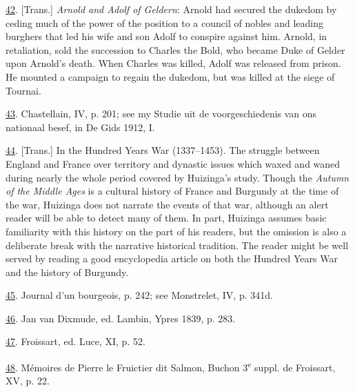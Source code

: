 \protect\hypertarget{23_NOTES.xhtmlux5cux23id_2148}{\protect\hyperlink{08_Chapter_One__THE_PASSIONATE_INTE.xhtmlux5cux23id_2147}{42}}.
{[}Trans.{]} \emph{Arnold and Adolf of Geldern}: Arnold had secured the
dukedom by ceding much of the power of the position to a council of
nobles and leading burghers that led his wife and son Adolf to conspire
against him. Arnold, in retaliation, sold the succession to Charles the
Bold, who became Duke of Gelder upon Arnold's death. When Charles was
killed, Adolf was released from prison. He mounted a campaign to regain
the dukedom, but was killed at the siege of Tournai.

\protect\hypertarget{23_NOTES.xhtmlux5cux23id_2146}{\protect\hyperlink{08_Chapter_One__THE_PASSIONATE_INTE.xhtmlux5cux23id_2145}{43}}.
Chastellain, IV, p. 201; see my Studie uit de voorgeschiedenis van ons
nationaal besef, in De Gids 1912, I.

\protect\hypertarget{23_NOTES.xhtmlux5cux23id_2144}{\protect\hyperlink{08_Chapter_One__THE_PASSIONATE_INTE.xhtmlux5cux23id_2143}{44}}.
{[}Trans.{]} In the Hundred Years War (1337--1453). The struggle between
\protect\hypertarget{23_NOTES.xhtmlux5cux23page_400}{}{}England and
France over territory and dynastic issues which waxed and waned during
nearly the whole period covered by Huizinga's study. Though the
\emph{Autumn of the Middle Ages} is a cultural history of France and
Burgundy at the time of the war, Huizinga does not narrate the events of
that war, although an alert reader will be able to detect many of them.
In part, Huizinga assumes basic familiarity with this history on the
part of his readers, but the omission is also a deliberate break with
the narrative historical tradition. The reader might be well served by
reading a good encyclopedia article on both the Hundred Years War and
the history of Burgundy.

\protect\hypertarget{23_NOTES.xhtmlux5cux23id_2142}{\protect\hyperlink{08_Chapter_One__THE_PASSIONATE_INTE.xhtmlux5cux23id_2141}{45}}.
Journal d'un bourgeois, p. 242; see Monstrelet, IV, p. 341d.

\protect\hypertarget{23_NOTES.xhtmlux5cux23id_2140}{\protect\hyperlink{08_Chapter_One__THE_PASSIONATE_INTE.xhtmlux5cux23id_2139}{46}}.
Jan van Dixmude, ed. Lambin, Ypres 1839, p. 283.

\protect\hypertarget{23_NOTES.xhtmlux5cux23id_2138}{\protect\hyperlink{08_Chapter_One__THE_PASSIONATE_INTE.xhtmlux5cux23id_2137}{47}}.
Froissart, ed. Luce, XI, p. 52.

\protect\hypertarget{23_NOTES.xhtmlux5cux23id_2136}{\protect\hyperlink{08_Chapter_One__THE_PASSIONATE_INTE.xhtmlux5cux23id_2135}{48}}.
Mémoires de Pierre le Fruictier dit Salmon, Buchon 3\textsuperscript{e}
suppl. de Froissart, XV, p. 22.

